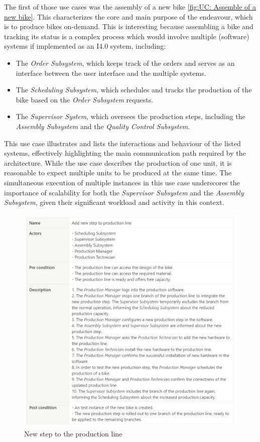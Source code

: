 \documentclass[conference]{IEEEtran}
\begin{document}
The first of those use cases was the assembly of a new bike \ref{fig:UC: Assemble of a new bike}. This characterizes the core and main purpose of the endeavour, which is to produce bikes on-demand. This is interesting because assembling a bike and tracking its status is a complex process which would involve multiple (software) systems if implemented as an I4.0 system, including:
\begin{itemize}
    \item The \textit{Order Subsystem}, which keeps track of the orders and serves as an interface between the user interface and the multiple systems.  
    \item The \textit{Scheduling Subsystem}, which schedules and tracks the production of the bike based on the \textit{Order Subsystem} requests. 
    \item The \textit{Supervisor System}, which oversees the production steps, including the \textit{Assembly Subsystem} and the \textit{Quality Control Subsystem}. 
\end{itemize}

This use case illustrates and lists the interactions and behaviour of the listed systems, effectively highlighting the main communication path required by the architecture. 
While the use case describes the production of one unit, it is reasonable to expect multiple units to be produced at the same time. The simultaneous execution of multiple instances in this use case underscores the importance of scalability for both the \textit{Supervisor Subsystem} and the \textit{Assembly Subsystem}, given their significant workload and activity in this context.

\begin{figure}
    \centering
    \includegraphics[width=1\linewidth]{img/UC Add new step to production line.png}
    \caption{New step to the production line}
    \label{fig:UC: New step to production line}
\end{figure}
\end{document}
